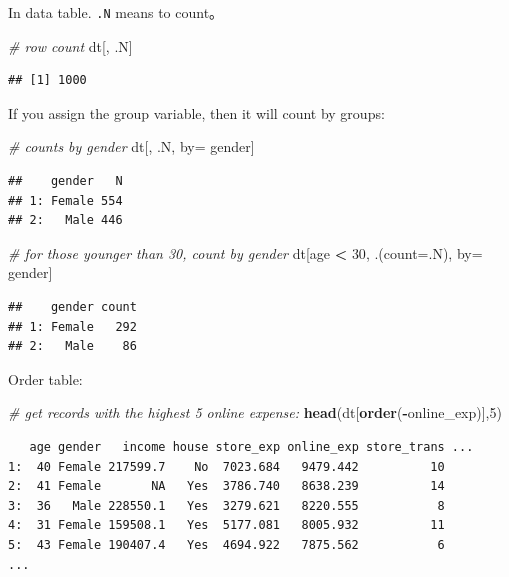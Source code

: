 \documentclass[12pt,]{krantz}
\makeatletter
\newenvironment{Shaded}{\begin{snugshade}}{\end{snugshade}}
\newcommand{\CommentTok}[1]{\textcolor[rgb]{0.37,0.37,0.37}{\textit{#1}}}
\newcommand{\DataTypeTok}[1]{\textcolor[rgb]{0.27,0.27,0.27}{#1}}
\newcommand{\DecValTok}[1]{\textcolor[rgb]{0.06,0.06,0.06}{#1}}
\newcommand{\KeywordTok}[1]{\textcolor[rgb]{0.27,0.27,0.27}{\textbf{#1}}}
\newcommand{\NormalTok}[1]{#1}
\newcommand{\OperatorTok}[1]{\textcolor[rgb]{0.43,0.43,0.43}{\textbf{#1}}}
\newcommand{\StringTok}[1]{\textcolor[rgb]{0.5,0.5,0.5}{#1}}
\newenvironment{kframe}{%
\medskip{}
\setlength{\fboxsep}{.8em}
 \def\at@end@of@kframe{}%
 \ifinner\ifhmode%
  \def\at@end@of@kframe{\end{minipage}}%
  \begin{minipage}{\columnwidth}%
 \fi\fi%
 \def\FrameCommand##1{\hskip\@totalleftmargin \hskip-\fboxsep
 \colorbox{shadecolor}{##1}\hskip-\fboxsep
     \hskip-\linewidth \hskip-\@totalleftmargin \hskip\columnwidth}%
 \MakeFramed {\advance\hsize-\width
   \@totalleftmargin\z@ \linewidth\hsize
   \@setminipage}}%
 {\par\unskip\endMakeFramed%
 \at@end@of@kframe}
\renewenvironment{Shaded}{\begin{kframe}}{\end{kframe}}
\makeatother
\begin{document}
In data table. \texttt{.N} means to count。

\begin{Shaded}
\begin{Highlighting}[]
\CommentTok{# row count}
\NormalTok{dt[, .N] }
\end{Highlighting}
\end{Shaded}

\begin{verbatim}
## [1] 1000
\end{verbatim}

If you assign the group variable, then it will count by groups:

\begin{Shaded}
\begin{Highlighting}[]
\CommentTok{# counts by gender}
\NormalTok{dt[, .N, by=}\StringTok{ }\NormalTok{gender]  }
\end{Highlighting}
\end{Shaded}

\begin{verbatim}
##    gender   N
## 1: Female 554
## 2:   Male 446
\end{verbatim}

\begin{Shaded}
\begin{Highlighting}[]
\CommentTok{# for those younger than 30, count by gender}
\NormalTok{ dt[age }\OperatorTok{<}\StringTok{ }\DecValTok{30}\NormalTok{, .(}\DataTypeTok{count=}\NormalTok{.N), by=}\StringTok{ }\NormalTok{gender] }
\end{Highlighting}
\end{Shaded}

\begin{verbatim}
##    gender count
## 1: Female   292
## 2:   Male    86
\end{verbatim}

Order table:

\begin{Shaded}
\begin{Highlighting}[]
\CommentTok{# get records with the highest 5 online expense:}
\KeywordTok{head}\NormalTok{(dt[}\KeywordTok{order}\NormalTok{(}\OperatorTok{-}\NormalTok{online_exp)],}\DecValTok{5}\NormalTok{) }
\end{Highlighting}
\end{Shaded}

\begin{verbatim}
   age gender   income house store_exp online_exp store_trans ...
1:  40 Female 217599.7    No  7023.684   9479.442          10
2:  41 Female       NA   Yes  3786.740   8638.239          14
3:  36   Male 228550.1   Yes  3279.621   8220.555           8
4:  31 Female 159508.1   Yes  5177.081   8005.932          11
5:  43 Female 190407.4   Yes  4694.922   7875.562           6
...
\end{verbatim}
\end{document}
